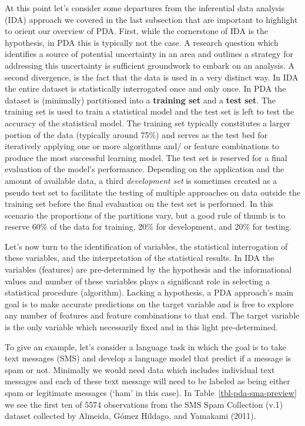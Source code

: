 \documentclass[
  letterpaper,
]{scrbook}
\begin{document}
At this point let's consider some departures from the inferential data
analysis (IDA) approach we covered in the last subsection that are
important to highlight to orient our overview of PDA. First, while the
cornerstone of IDA is the hypothesis, in PDA this is typically not the
case. A research question which identifies a source of potential
uncertainty in an area and outlines a strategy for addressing this
uncertainty is sufficient groundwork to embark on an analysis. A second
divergence, is the fact that the data is used in a very distinct way. In
IDA the entire dataset is statistically interrogated once and only once.
In PDA the dataset is (minimally) partitioned into a \textbf{training
set} and a \textbf{test set}. The training set is used to train a
statistical model and the test set is left to test the accuracy of the
statistical model. The training set typically constitutes a larger
portion of the data (typically around 75\%) and serves as the test bed
for iteratively applying one or more algorithms and/ or feature
combinations to produce the most successful learning model. The test set
is reserved for a final evaluation of the model's performance. Depending
on the application and the amount of available data, a third
\emph{development set} is sometimes created as a pseudo test set to
facilitate the testing of multiple approaches on data outside the
training set before the final evaluation on the test set is performed.
In this scenario the proportions of the partitions vary, but a good rule
of thumb is to reserve 60\% of the data for training, 20\% for
development, and 20\% for testing.

Let's now turn to the identification of variables, the statistical
interrogation of these variables, and the interpretation of the
statistical results. In IDA the variables (features) are pre-determined
by the hypothesis and the informational values and number of these
variables plays a significant role in selecting a statistical procedure
(algorithm). Lacking a hypothesis, a PDA approach's main goal is to make
accurate predictions on the target variable and is free to explore any
number of features and feature combinations to that end. The target
variable is the only variable which necessarily fixed and in this light
pre-determined.

To give an example, let's consider a language task in which the goal is
to take text messages (SMS) and develop a language model that predict if
a message is spam or not. Minimally we would need data which includes
individual text messages and each of these text message will need to be
labeled as being either spam or legitimate messages (`ham' in this
case). In Table~\ref{tbl-pda-sma-preview} we see the first ten of 5574
observations from the SMS Spam Collection (v.1) dataset collected by
Almeida, Gómez Hildago, and Yamakami (2011).
\end{document}
